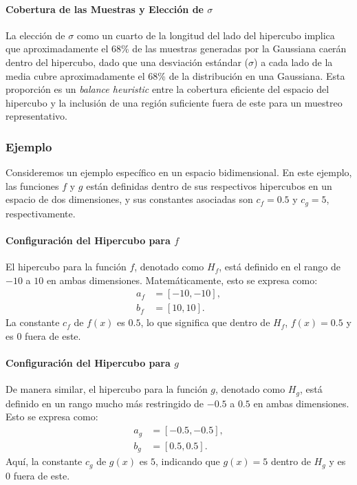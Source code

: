 \documentclass{article}
\begin{document}
\paragraph{Cobertura de las Muestras y Elección de \( \sigma \)}
La elección de \( \sigma \) como un cuarto de la longitud del lado del hipercubo implica que aproximadamente el 68\% de las muestras generadas por la Gaussiana caerán dentro del hipercubo, dado que una desviación estándar (\( \sigma \)) a cada lado de la media cubre aproximadamente el 68\% de la distribución en una Gaussiana. Esta proporción es un \textit{balance heuristic} entre la cobertura eficiente del espacio del hipercubo y la inclusión de una región suficiente fuera de este para un muestreo representativo.

\subsubsection{Ejemplo}
Consideremos un ejemplo específico en un espacio bidimensional. En este ejemplo, las funciones \( f \) y \( g \) están definidas dentro de sus respectivos hipercubos en un espacio de dos dimensiones, y sus constantes asociadas son \( c_f = 0.5 \) y \( c_g = 5 \), respectivamente.

\paragraph{Configuración del Hipercubo para \( f \)}
El hipercubo para la función \( f \), denotado como \( H_f \), está definido en el rango de \(-10\) a \(10\) en ambas dimensiones. Matemáticamente, esto se expresa como:
\begin{align*}
    a_f &= [-10, -10], \\
    b_f &= [10, 10].
\end{align*}
La constante \( c_f \) de \( f(x) \) es \( 0.5 \), lo que significa que dentro de \( H_f \), \( f(x) = 0.5 \) y es \( 0 \) fuera de este.

\paragraph{Configuración del Hipercubo para \( g \)}
De manera similar, el hipercubo para la función \( g \), denotado como \( H_g \), está definido en un rango mucho más restringido de \(-0.5\) a \(0.5\) en ambas dimensiones. Esto se expresa como:
\begin{align*}
    a_g &= [-0.5, -0.5], \\
    b_g &= [0.5, 0.5].
\end{align*}
Aquí, la constante \( c_g \) de \( g(x) \) es \( 5 \), indicando que \( g(x) = 5 \) dentro de \( H_g \) y es \( 0 \) fuera de este.
\end{document}
